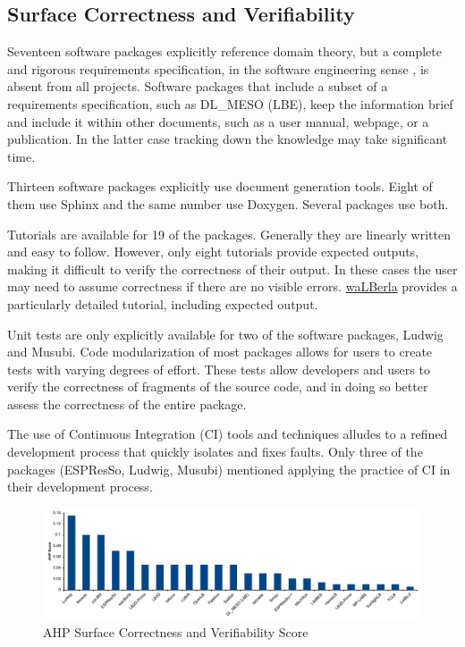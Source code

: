 \documentclass[final, 3p, times, authoryear]{elsarticle}
\begin{document}
\subsection{Surface Correctness and Verifiability} \label{SecSurfCorrectAndVerifiab}

Seventeen software packages explicitly reference domain theory, but a complete
and rigorous requirements specification, in the software engineering sense
\citep{IEEE1998, RobertsonAndRobertson1999Vol, ESA1991}, is absent from all
projects. Software packages that include a subset of a requirements
specification, such as DL\_MESO (LBE), keep the information brief and include it
within other documents, such as a user manual, webpage, or a publication. In the
latter case tracking down the knowledge may take significant time. 

Thirteen software packages explicitly use document generation tools. Eight of
them use Sphinx and the same number use Doxygen. Several packages use both.

Tutorials are available for 19 of the packages. Generally they are linearly
written and easy to follow. However, only eight tutorials provide expected
outputs, making it difficult to verify the correctness of their output. In these
cases the user may need to assume correctness if there are no visible errors.
\href{https://www.walberla.net/doxygen/index.html} {waLBerla} provides a
particularly detailed tutorial, including expected output.

Unit tests are only explicitly available for two of the software packages,
Ludwig and Musubi. Code modularization of most packages allows for users to
create tests with varying degrees of effort. These tests allow developers and
users to verify the correctness of fragments of the source code, and in doing so
better assess the correctness of the entire package.

The use of Continuous Integration (CI) tools and techniques alludes to a refined
development process that quickly isolates and fixes faults. Only three of the
packages (ESPResSo, Ludwig, Musubi) mentioned applying the practice of CI in
their development process.

\begin{figure}[h!]
	\begin{center}
		\includegraphics[width=1.0\textwidth]{./figures/correctnessverifiability.pdf}
		\caption{AHP Surface Correctness and Verifiability Score}
		\label{Fig_CorrectnessVerifiability}
	\end{center}
\end{figure}
\end{document}

